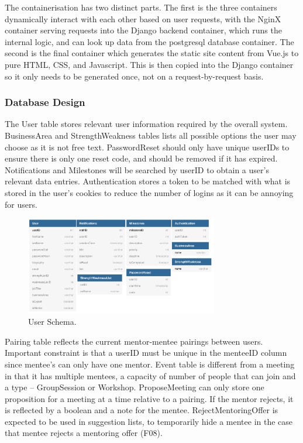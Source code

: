 \documentclass[10pt]{article}
\begin{document}
The containerisation has two distinct parts. The first is the three containers
dynamically interact with each other based on user requests, with the NginX
container serving requests into the Django backend container, which runs the
internal logic, and can look up data from the postgresql database container. The
second is the final container which generates the static site content from
Vue.js to pure HTML, CSS, and Javascript. This is then copied into the Django
container so it only needs to be generated once, not on a request-by-request
basis.

\subsubsection{Database Design}

The User table stores relevant user information required by the overall system.
BusinessArea and StrengthWeakness tables lists all possible options the user may
choose as it is not free text. PasswordReset should only have unique userIDs to
ensure there is only one reset code, and should be removed if it has expired.
Notifications and Milestones will be searched by userID to obtain a user's
relevant data entries. Authentication stores a token to be matched with what is
stored in the user's cookies to reduce the number of logins as it can be
annoying for users.
\begin{figure}[H]
    \centering
    \includegraphics[width=0.75\textwidth]{UserDB}
    \caption{User Schema.}
    \label{fig:User Schema}
\end{figure}

Pairing table reflects the current mentor-mentee pairings between users.
Important constraint is that a userID must be unique in the menteeID column
since mentee's can only have one mentor. Event table is different from a meeting
in that it has multiple mentees, a capacity of number of people that can join
and a type – GroupSession or Workshop. ProposeMeeting can only store one
proposition for a meeting at a time relative to a pairing. If the mentor
rejects, it is reflected by a boolean and a note for the mentee.
RejectMentoringOffer is expected to be used in suggestion lists, to temporarily
hide a mentee in the case that mentee rejects a mentoring offer (F08).
\end{document}
